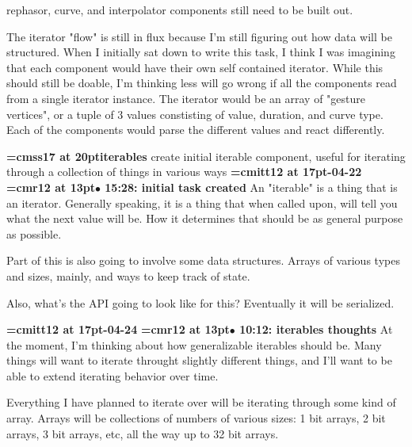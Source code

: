 rephasor, curve, and interpolator components still need to be built out.
\par

The iterator "flow" is still in flux because I'm still figuring out how data will be structured. When I initially sat down to write this task, I think I was imagining that each component would have their own self contained iterator. While this should still be doable, I'm thinking less will go wrong if all the components read from a single iterator instance. The iterator would be an array of "gesture vertices", or a tuple of 3 values constisting of value, duration, and curve type. Each of the components would parse the different values and react differently.
\par

{\medskip\noindent\bf\font\titlefont=cmss17 at 20pt\titlefont iterables}\medskip
create initial iterable component, useful for iterating through
a collection of things in various ways
{\medskip\noindent\bf\font\titlefont=cmitt12 at 17pt-04-22}\medskip
{\smallskip\noindent\bf\font\titlefont=cmr12 at 13pt\titlefont $\bullet$ 15:28: initial task created}\smallskip
An "iterable" is a thing that is an iterator. Generally speaking, it is a thing that when called upon, will tell you what the next value will be. How it determines that should be as general purpose as possible.
\par

Part of this is also going to involve some data structures. Arrays of various types and sizes, mainly, and ways to keep track of state.
\par

Also, what's the API going to look like for this? Eventually it will be serialized.
\par

{\medskip\noindent\bf\font\titlefont=cmitt12 at 17pt-04-24}\medskip
{\smallskip\noindent\bf\font\titlefont=cmr12 at 13pt\titlefont $\bullet$ 10:12: iterables thoughts}\smallskip
At the moment, I'm thinking about how generalizable iterables should be. Many things will want to iterate throught slightly different things, and I'll want to be able to extend iterating behavior over time.
\par

Everything I have planned to iterate over will be iterating through some kind of array. Arrays will be collections of numbers of various sizes: 1 bit arrays, 2 bit arrays, 3 bit arrays, etc, all the way up to 32 bit arrays.
\par

